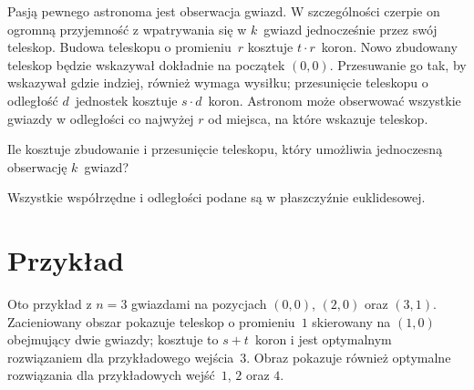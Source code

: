 
\noindent
Pasją pewnego astronoma jest obserwacja gwiazd.
W szczególności czerpie on ogromną przyjemność z wpatrywania się w $k$~gwiazd jednocześnie przez swój teleskop.   
Budowa teleskopu o promieniu~$r$ kosztuje $t\cdot r$~koron.
Nowo zbudowany teleskop będzie wskazywał dokładnie na początek $(0,0)$.
Przesuwanie go tak, by wskazywał gdzie indziej, również wymaga wysiłku; 
przesunięcie teleskopu o odległość $d$~jednostek kosztuje $s\cdot d$~koron.
Astronom może obserwować wszystkie gwiazdy w odległości co najwyżej $r$ od miejsca, na które wskazuje teleskop.

Ile kosztuje zbudowanie i przesunięcie teleskopu, który umożliwia jednoczesną obserwację $k$~gwiazd?

\medskip

Wszystkie współrzędne i odległości podane są w płaszczyźnie euklidesowej.


\section*{Przykład}

Oto przykład z $n=3$ gwiazdami na pozycjach $(0,0)$, $(2,0)$ oraz $(3,1)$.
Zacieniowany obszar pokazuje teleskop o promieniu~$1$ skierowany na $(1,0)$ obejmujący dwie gwiazdy; kosztuje to $s + t$~koron i jest optymalnym rozwiązaniem dla przykładowego wejścia~$3$.
Obraz pokazuje również optymalne rozwiązania dla przykładowych wejść~$1$, $2$ oraz $4$.

